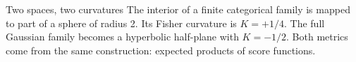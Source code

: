 \documentclass[aspectratio=169,11pt]{beamer}
\begin{document}
\begin{frame}{Two spaces, two curvatures}
The interior of a finite categorical family is mapped
to part of a sphere of radius 2.
Its Fisher curvature is \(K=+1/4\).
\vspace{.49cm}
The full Gaussian family becomes a hyperbolic half-plane
with \(K=-1/2\).
\vspace{.49cm}
Both metrics come from the same construction:
expected products of score functions.
\end{frame}
\end{document}
